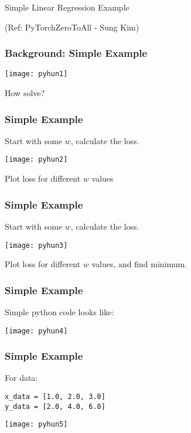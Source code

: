 
\begin{frame}
  \begin{center}
    {\Large Simple Linear Regression Example}
    
\tiny{(Ref: PyTorchZeroToAll  - Sung Kim)}
  \end{center}
\end{frame}

\begin{frame}[fragile] \frametitle{Background: Simple Example}
\begin{center}
\texttt{[image: pyhun1]}
\end{center}

How solve?


\end{frame}

\begin{frame}[fragile] \frametitle{Simple Example}
 Start with some $w$, calculate the loss.
\begin{center}
\texttt{[image: pyhun2]}
\end{center}

Plot loss for different $w$ values


\end{frame}


\begin{frame}[fragile] \frametitle{Simple Example}
 Start with some $w$, calculate the loss.
\begin{center}
\texttt{[image: pyhun3]}
\end{center}

Plot loss for different $w$ values, and find minimum.

\end{frame}


\begin{frame}[fragile] \frametitle{Simple Example}
Simple python code looks like:
\begin{center}
\texttt{[image: pyhun4]}
\end{center}


\end{frame}

\begin{frame}[fragile] \frametitle{Simple Example}
For data:
\begin{lstlisting}
x_data = [1.0, 2.0, 3.0]
y_data = [2.0, 4.0, 6.0]
\end{lstlisting}

\begin{center}
\texttt{[image: pyhun5]}
\end{center}


\end{frame}

